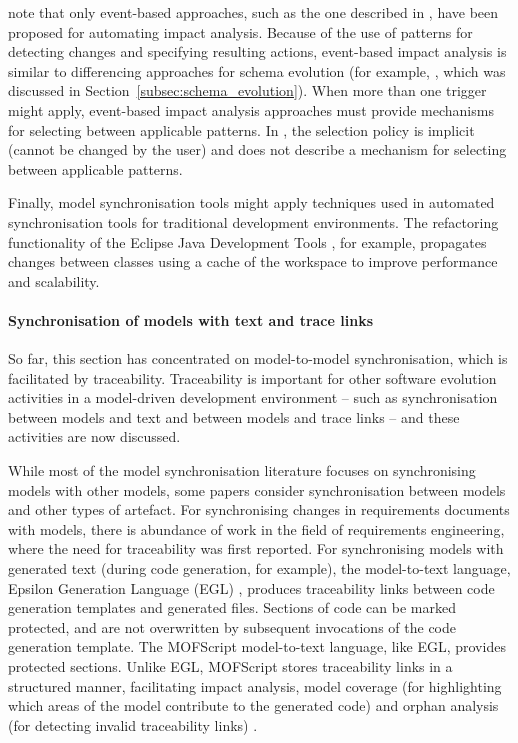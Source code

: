 \cite{winkler09survey} note that only event-based approaches, such as the one described in \cite{briand03impactanalysis}, have been proposed for automating impact analysis. Because of the use of patterns for detecting changes and specifying resulting actions, event-based impact analysis is similar to differencing approaches for schema evolution (for example, \cite{lerner00model}, which was discussed in Section~\ref{subsec:schema_evolution}). When more than one trigger might apply, event-based impact analysis approaches must provide mechanisms for selecting between applicable patterns. In \cite{briand03impactanalysis}, the selection policy is implicit (cannot be changed by the user) and \cite{briand03impactanalysis} does not describe a mechanism for selecting between applicable patterns.

Finally, model synchronisation tools might apply techniques used in automated synchronisation tools for traditional development environments. The refactoring functionality of the Eclipse Java Development Tools \cite{fuhrer07refactoring}, for example, propagates changes between classes using a cache of the workspace to improve performance and scalability.


\paragraph{Synchronisation of models with text and trace links}
So far, this section has concentrated on model-to-model synchronisation, which is facilitated by traceability. Traceability is important for other software evolution activities in a model-driven development environment -- such as synchronisation between models and text and between models and trace links -- and these activities are now discussed.

While most of the model synchronisation literature focuses on synchronising models with other models, some papers consider synchronisation between models and other types of artefact. For synchronising changes in requirements documents with models, there is abundance of work in the field of requirements engineering, where the need for traceability was first reported. For synchronising models with generated text (during code generation, for example), the model-to-text language, Epsilon Generation Language (EGL) \cite{rose08egl}, produces traceability links between code generation templates and generated files. Sections of code can be marked protected, and are not overwritten by subsequent invocations of the code generation template. The MOFScript model-to-text language, like EGL, provides protected sections. Unlike EGL, MOFScript stores traceability links in a structured manner, facilitating impact analysis, model coverage (for highlighting which areas of the model contribute to the generated code) and orphan analysis (for detecting invalid traceability links) \cite{olsen07traceability}.


